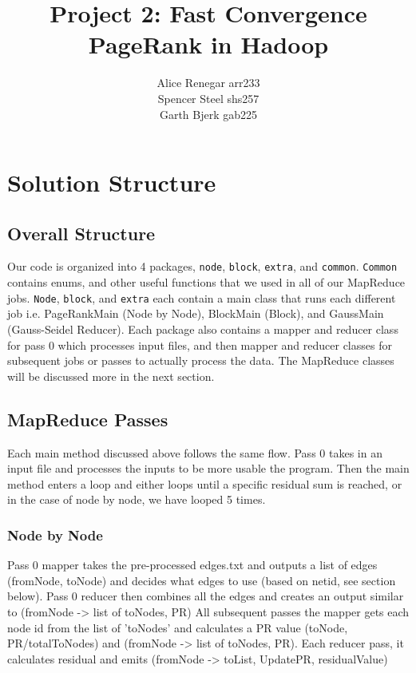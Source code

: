\documentclass[11pt,letterpaper]{article}
\title{Project 2: Fast Convergence PageRank in Hadoop}
\author{Alice Renegar arr233 \\ Spencer Steel shs257 \\ Garth Bjerk gab225}
\begin{document}
\univlogo
{\let\newpage\relax\maketitle}

\section{Solution Structure}
\subsection{Overall Structure}
Our code is organized into 4 packages, \texttt{node}, \texttt{block}, \texttt{extra}, and \texttt{common}. \texttt{Common} contains enums, and other useful functions that we used in all of our MapReduce jobs. \texttt{Node}, \texttt{block}, and \texttt{extra} each contain a main class that runs each different job i.e. PageRankMain (Node by Node), BlockMain (Block), and GaussMain (Gauss-Seidel Reducer). Each package also contains a mapper and reducer class for pass 0 which processes input files, and then mapper and reducer classes for subsequent jobs or passes to actually process the data. The MapReduce classes will be discussed more in the next section.
\\
\subsection{MapReduce Passes}
Each main method discussed above follows the same flow. Pass 0 takes in an input file and processes the inputs to be more usable the program. Then the main method enters a loop and either loops until a specific residual sum is reached, or in the case of node by node, we have looped 5 times. 
\subsubsection{Node by Node} Pass 0 mapper takes the pre-processed edges.txt and outputs a list of edges (fromNode, toNode) and decides what edges to use (based on netid, see section below). Pass 0 reducer then combines all the edges and creates an output similar to (fromNode -> list of toNodes, PR)
All subsequent passes the mapper gets each node id from the list of 'toNodes' and calculates a PR value (toNode, PR/totalToNodes) and (fromNode -> list of toNodes, PR). Each reducer pass, it calculates residual and emits (fromNode -> toList, UpdatePR, residualValue)
\end{document}
